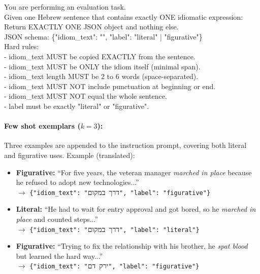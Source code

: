 \documentclass[11pt, a4paper]{report}
\begin{document}
\noindent
\begin{tcolorbox}[
    enhanced,
    width=\linewidth,
    colback=trueblue1,
    colframe=black,
    coltext=black,
    arc=8pt,
    boxrule=0.4pt,
    title=Instruction Prompt,
    coltitle=black,
    colbacktitle=trueblue2,
    fonttitle=\bfseries,
    boxed title style={sharp corners=south, colframe=black, colback=trueblue2, boxrule=0.4pt},
    left=6pt, right=6pt, top=4pt, bottom=4pt
]
\small\ttfamily
You are performing an evaluation task.\\[0.4em]
Given one Hebrew sentence that contains exactly ONE idiomatic expression:\\[0.4em]
Return EXACTLY ONE JSON object and nothing else.\\[0.4em]
JSON schema: \{"idiom\_text": "", "label": "literal" | "figurative"\}\\[0.4em]
Hard rules:\\
- idiom\_text MUST be copied EXACTLY from the sentence.\\
- idiom\_text MUST be ONLY the idiom itself (minimal span).\\
- idiom\_text length MUST be 2 to 6 words (space-separated).\\
- idiom\_text MUST NOT include punctuation at beginning or end.\\
- idiom\_text MUST NOT equal the whole sentence.\\
- label must be exactly "literal" or "figurative".
\end{tcolorbox}

\paragraph{Few shot exemplars ($k=3$):}
Three examples are appended to the instruction prompt, covering both literal and figurative uses. Example (translated):
\begin{itemize}
    \item \textbf{Figurative:} ``For five years, the veteran manager \textit{marched in place} because he refused to adopt new technologies...''\\
    $\rightarrow$ \texttt{\{"idiom\_text": "}\mbox{\beginR\foreignlanguage{hebrew}{דרך במקום}\endR}\texttt{", "label": "figurative"\}}
    \item \textbf{Literal:} ``He had to wait for entry approval and got bored, so he \textit{marched in place} and counted steps...''\\
    $\rightarrow$ \texttt{\{"idiom\_text": "}\mbox{\beginR\foreignlanguage{hebrew}{דרך במקום}\endR}\texttt{", "label": "literal"\}}
    \item \textbf{Figurative:} ``Trying to fix the relationship with his brother, he \textit{spat blood} but learned the hard way...''\\
    $\rightarrow$ \texttt{\{"idiom\_text": "}\mbox{\beginR\foreignlanguage{hebrew}{ירק דם}\endR}\texttt{", "label": "figurative"\}}
\end{itemize}
\end{document}
